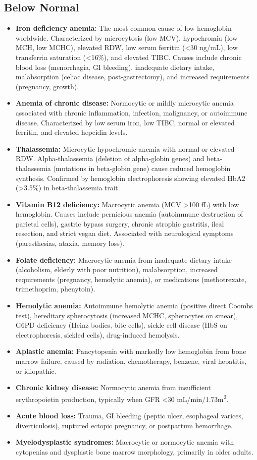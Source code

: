 \subsection*{Below Normal}
\begin{itemize}
  \item \textbf{Iron deficiency anemia:} The most common cause of low hemoglobin worldwide. Characterized by microcytosis (low MCV), hypochromia (low MCH, low MCHC), elevated RDW, low serum ferritin (<30 ng/mL), low transferrin saturation (<16\%), and elevated TIBC. Causes include chronic blood loss (menorrhagia, GI bleeding), inadequate dietary intake, malabsorption (celiac disease, post-gastrectomy), and increased requirements (pregnancy, growth).
  \item \textbf{Anemia of chronic disease:} Normocytic or mildly microcytic anemia associated with chronic inflammation, infection, malignancy, or autoimmune disease. Characterized by low serum iron, low TIBC, normal or elevated ferritin, and elevated hepcidin levels.
  \item \textbf{Thalassemia:} Microcytic hypochromic anemia with normal or elevated RDW. Alpha-thalassemia (deletion of alpha-globin genes) and beta-thalassemia (mutations in beta-globin gene) cause reduced hemoglobin synthesis. Confirmed by hemoglobin electrophoresis showing elevated HbA2 (>3.5\%) in beta-thalassemia trait.
  \item \textbf{Vitamin B12 deficiency:} Macrocytic anemia (MCV >100 fL) with low hemoglobin. Causes include pernicious anemia (autoimmune destruction of parietal cells), gastric bypass surgery, chronic atrophic gastritis, ileal resection, and strict vegan diet. Associated with neurological symptoms (paresthesias, ataxia, memory loss).
  \item \textbf{Folate deficiency:} Macrocytic anemia from inadequate dietary intake (alcoholism, elderly with poor nutrition), malabsorption, increased requirements (pregnancy, hemolytic anemia), or medications (methotrexate, trimethoprim, phenytoin).
  \item \textbf{Hemolytic anemia:} Autoimmune hemolytic anemia (positive direct Coombs test), hereditary spherocytosis (increased MCHC, spherocytes on smear), G6PD deficiency (Heinz bodies, bite cells), sickle cell disease (HbS on electrophoresis, sickled cells), drug-induced hemolysis.
  \item \textbf{Aplastic anemia:} Pancytopenia with markedly low hemoglobin from bone marrow failure, caused by radiation, chemotherapy, benzene, viral hepatitis, or idiopathic.
  \item \textbf{Chronic kidney disease:} Normocytic anemia from insufficient erythropoietin production, typically when GFR <30 mL/min/1.73m\textsuperscript{2}.
  \item \textbf{Acute blood loss:} Trauma, GI bleeding (peptic ulcer, esophageal varices, diverticulosis), ruptured ectopic pregnancy, or postpartum hemorrhage.
  \item \textbf{Myelodysplastic syndromes:} Macrocytic or normocytic anemia with cytopenias and dysplastic bone marrow morphology, primarily in older adults.
\end{itemize}

